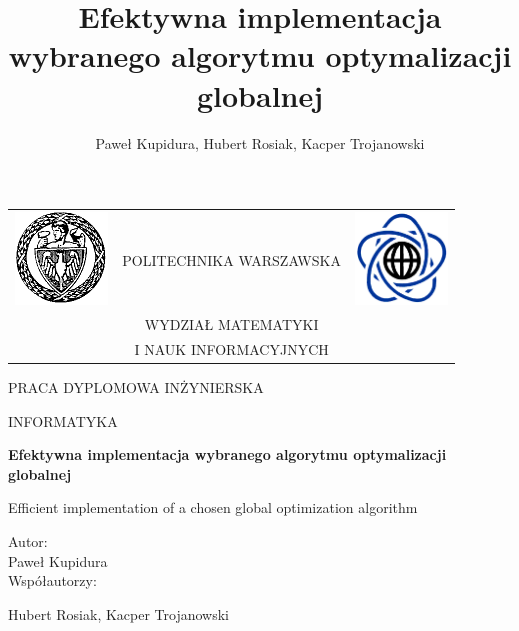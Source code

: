 \documentclass[12pt, twoside, openany, abstract=on]{report}
\author{Paweł Kupidura, Hubert Rosiak, Kacper Trojanowski}
\title{Efektywna implementacja wybranego algorytmu optymalizacji globalnej}
\theoremstyle{definition}
\begin{document}
\begin{titlepage}
\pagestyle{empty}

\noindent
\begin{Large}
\begin{table}[t]
\centering
\begin{tabular}[t]{lcr}
 \includegraphics[width=70pt,height=70pt]{PW} & POLITECHNIKA WARSZAWSKA & \includegraphics[width=70pt,height=70pt]{MiNI}\\
& WYDZIAŁ MATEMATYKI & \\
& I NAUK INFORMACYJNYCH &
\end{tabular}
\end{table}

\begin{center}PRACA DYPLOMOWA INŻYNIERSKA\end{center}
\begin{center}INFORMATYKA\end{center}\end{Large}
\begin{center}
\Huge
\textbf{Efektywna implementacja wybranego algorytmu optymalizacji globalnej}\\
\end{center}

\large Efficient implementation of a chosen global optimization algorithm

\vfill
\begin{center}
\Large
Autor:\\
\LARGE
Paweł Kupidura\\

\vspace{5mm}
\Large
Współautorzy:


Hubert Rosiak, Kacper Trojanowski


\end{center}
\end{titlepage}
\end{document}
